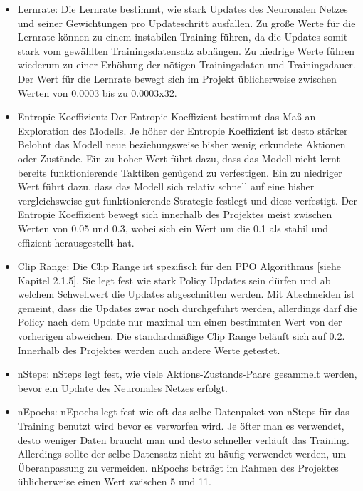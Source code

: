 \begin{itemize}
\item Lernrate: Die Lernrate bestimmt, wie stark Updates des Neuronalen Netzes und seiner Gewichtungen pro Updateschritt ausfallen. Zu große Werte für die Lernrate können zu einem instabilen Training führen, da die Updates somit stark vom gewählten Trainingsdatensatz abhängen. Zu niedrige Werte führen wiederum zu einer Erhöhung der nötigen Trainingsdaten und Trainingsdauer. Der Wert für die Lernrate bewegt sich im Projekt üblicherweise zwischen Werten von 0.0003 bis zu 0.0003x32.

\item Entropie Koeffizient: Der Entropie Koeffizient bestimmt das Maß an Exploration des Modells. Je höher der Entropie Koeffizient ist desto stärker Belohnt das Modell neue beziehungsweise bisher wenig erkundete Aktionen oder Zustände. Ein zu hoher Wert führt dazu, dass das Modell nicht lernt bereits funktionierende Taktiken genügend zu verfestigen. Ein zu niedriger Wert führt dazu, dass das Modell sich relativ schnell auf eine bisher vergleichsweise gut funktionierende Strategie festlegt und diese verfestigt. Der Entropie Koeffizient bewegt sich innerhalb des Projektes meist zwischen Werten von 0.05 und 0.3, wobei sich ein Wert um die 0.1 als stabil und effizient herausgestellt hat.

\item Clip Range: Die Clip Range ist spezifisch für den PPO Algorithmus [siehe Kapitel 2.1.5]. Sie legt fest wie stark Policy Updates sein dürfen und ab welchem Schwellwert die Updates abgeschnitten werden. Mit Abschneiden ist gemeint, dass die Updates zwar noch durchgeführt werden, allerdings darf die Policy nach dem Update nur maximal um einen bestimmten Wert von der vorherigen abweichen. Die standardmäßige Clip Range beläuft sich auf 0.2. Innerhalb des Projektes werden auch andere Werte getestet.

\item nSteps: nSteps legt fest, wie viele Aktions-Zustands-Paare gesammelt werden, bevor ein Update des Neuronales Netzes erfolgt.

\item nEpochs: nEpochs legt fest wie oft das selbe Datenpaket von nSteps für das Training benutzt wird bevor es verworfen wird. Je öfter man es verwendet, desto weniger Daten braucht man und desto schneller verläuft das Training. Allerdings sollte der selbe Datensatz nicht zu häufig verwendet werden, um Überanpassung zu vermeiden. nEpochs beträgt im Rahmen des Projektes üblicherweise einen Wert zwischen 5 und 11.


\end{itemize}
